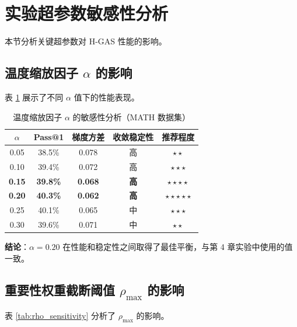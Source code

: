 \section{实验超参数敏感性分析}
\label{sec:appendix_hyperparam_sensitivity}

本节分析关键超参数对 H-GAS 性能的影响。

\subsection{温度缩放因子 $\alpha$ 的影响}

表 \ref{tab:alpha_sensitivity} 展示了不同 $\alpha$ 值下的性能表现。

\begin{table}[htbp]
    \centering
    \caption{温度缩放因子 $\alpha$ 的敏感性分析（MATH 数据集）}\label{tab:alpha_sensitivity}
    \begin{tabular}{|c|c|c|c|c|}
    \hline
    \textbf{$\alpha$} & \textbf{Pass@1} & \textbf{梯度方差} & \textbf{收敛稳定性} & \textbf{推荐程度} \\
    \hline
    0.05 & 38.5\% & 0.078 & 高 & $\star\star$ \\
    0.10 & 39.4\% & 0.072 & 高 & $\star\star\star$ \\
    \textbf{0.15} & \textbf{39.8\%} & \textbf{0.068} & \textbf{高} & $\star\star\star\star$ \\
    \textbf{0.20} & \textbf{40.3\%} & \textbf{0.062} & \textbf{高} & $\star\star\star\star\star$ \\
    0.25 & 40.1\% & 0.065 & 中 & $\star\star\star$ \\
    0.30 & 39.6\% & 0.071 & 中 & $\star\star$ \\
    \hline
    \end{tabular}
\end{table}

\textbf{结论}：$\alpha = 0.20$ 在性能和稳定性之间取得了最佳平衡，与第 4 章实验中使用的值一致。

\subsection{重要性权重截断阈值 $\rho_{\max}$ 的影响}

表 \ref{tab:rho_sensitivity} 分析了 $\rho_{\max}$ 的影响。

